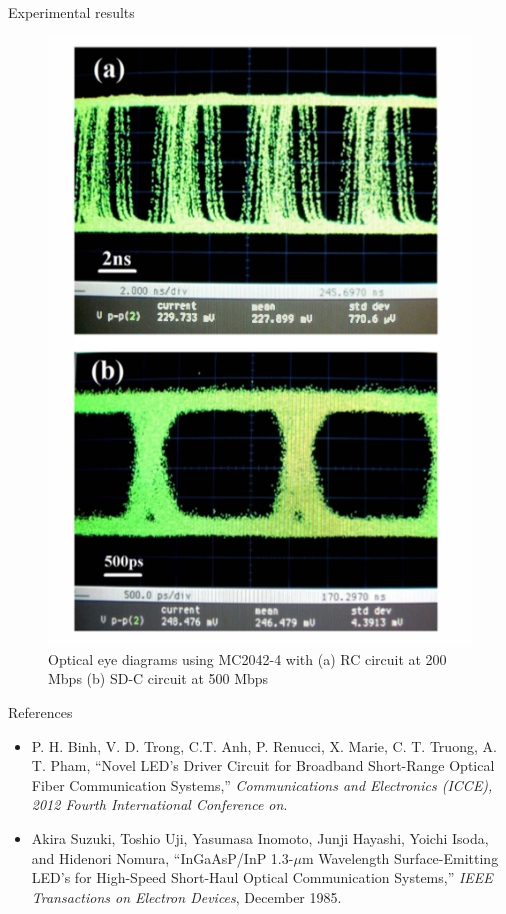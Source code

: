 \documentclass[mathserif]{beamer}
\begin{document}
    \begin{frame}{Experimental results}
        \pause
        \begin{figure}
            \centering
            \includegraphics[height=0.6\textheight]{eyeDiagrams.png}
            \caption{Optical eye diagrams using MC2042-4 with (a) RC circuit at 200 Mbps (b) SD-C circuit at 500 Mbps}
        \end{figure}
    \end{frame}
    
    \begin{frame}{References}
        \pause
        \begin{itemize}
                 \item P. H. Binh, V. D. Trong, C.T. Anh, P. Renucci, X. Marie, C. T. Truong, A. T. Pham, ``Novel LED's Driver Circuit for Broadband Short-Range Optical Fiber Communication Systems,'' \emph{Communications and Electronics (ICCE), 2012 Fourth International Conference on}.
                 \item Akira Suzuki, Toshio Uji, Yasumasa Inomoto, Junji Hayashi, Yoichi Isoda, and Hidenori Nomura, ``InGaAsP/InP 1.3-$\mu$m Wavelength Surface-Emitting LED's for High-Speed Short-Haul Optical Communication Systems,'' \emph{IEEE Transactions on Electron Devices}, December 1985.
        \end{itemize}
    \end{frame}
    
    
\end{document}

